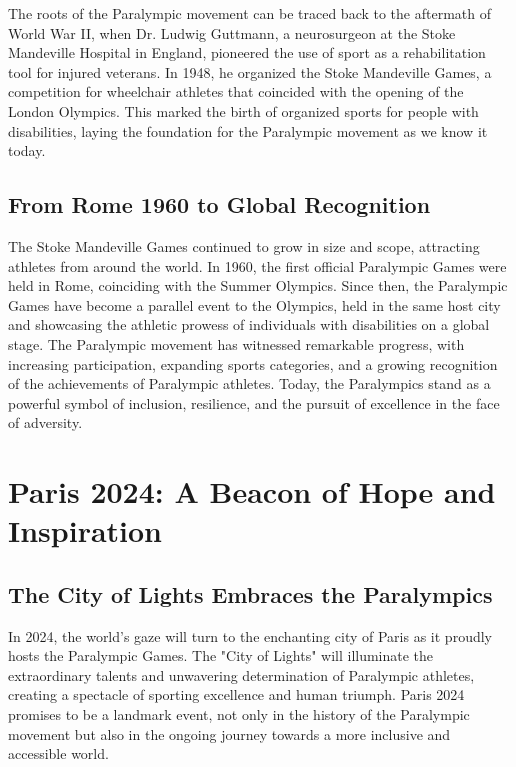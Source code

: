 The roots of the Paralympic movement can be traced back to the aftermath of World War II, when Dr. Ludwig Guttmann, a neurosurgeon at the Stoke Mandeville Hospital in England, pioneered the use of sport as a rehabilitation tool for injured veterans. In 1948, he organized the Stoke Mandeville Games, a competition for wheelchair athletes that coincided with the opening of the London Olympics. This marked the birth of organized sports for people with disabilities, laying the foundation for the Paralympic movement as we know it today.

\subsection{From Rome 1960 to Global Recognition}

The Stoke Mandeville Games continued to grow in size and scope, attracting athletes from around the world. In 1960, the first official Paralympic Games were held in Rome, coinciding with the Summer Olympics. Since then, the Paralympic Games have become a parallel event to the Olympics, held in the same host city and showcasing the athletic prowess of individuals with disabilities on a global stage. The Paralympic movement has witnessed remarkable progress, with increasing participation, expanding sports categories, and a growing recognition of the achievements of Paralympic athletes. Today, the Paralympics stand as a powerful symbol of inclusion, resilience, and the pursuit of excellence in the face of adversity.

\section{Paris 2024: A Beacon of Hope and Inspiration}

\subsection{The City of Lights Embraces the Paralympics}

In 2024, the world's gaze will turn to the enchanting city of Paris as it proudly hosts the Paralympic Games. The "City of Lights" will illuminate the extraordinary talents and unwavering determination of Paralympic athletes, creating a spectacle of sporting excellence and human triumph. Paris 2024 promises to be a landmark event, not only in the history of the Paralympic movement but also in the ongoing journey towards a more inclusive and accessible world.

